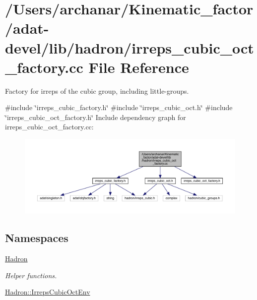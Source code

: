 \hypertarget{adat-devel_2lib_2hadron_2irreps__cubic__oct__factory_8cc}{}\section{/\+Users/archanar/\+Kinematic\+\_\+factor/adat-\/devel/lib/hadron/irreps\+\_\+cubic\+\_\+oct\+\_\+factory.cc File Reference}
\label{adat-devel_2lib_2hadron_2irreps__cubic__oct__factory_8cc}


Factory for irreps of the cubic group, including little-\/groups.  


{\ttfamily \#include \char`\"{}irreps\+\_\+cubic\+\_\+factory.\+h\char`\"{}}\newline
{\ttfamily \#include \char`\"{}irreps\+\_\+cubic\+\_\+oct.\+h\char`\"{}}\newline
{\ttfamily \#include \char`\"{}irreps\+\_\+cubic\+\_\+oct\+\_\+factory.\+h\char`\"{}}\newline
Include dependency graph for irreps\+\_\+cubic\+\_\+oct\+\_\+factory.\+cc\+:
\nopagebreak
\begin{figure}[H]
\begin{center}
\leavevmode
\includegraphics[width=350pt]{dc/d33/adat-devel_2lib_2hadron_2irreps__cubic__oct__factory_8cc__incl}
\end{center}
\end{figure}
\subsection*{Namespaces}
\begin{DoxyCompactItemize}
\item 
 \mbox{\hyperlink{namespaceHadron}{Hadron}}
\begin{DoxyCompactList}\small\item\em Helper functions. \end{DoxyCompactList}\item 
 \mbox{\hyperlink{namespaceHadron_1_1IrrepsCubicOctEnv}{Hadron\+::\+Irreps\+Cubic\+Oct\+Env}}
\end{DoxyCompactItemize}
